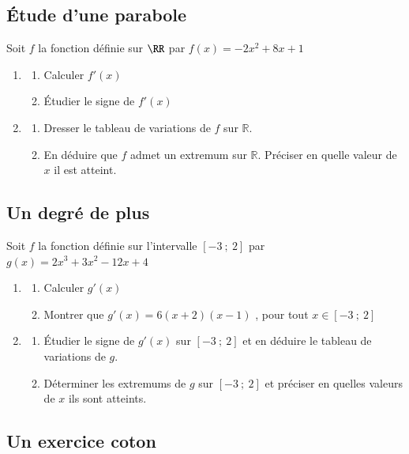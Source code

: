 \documentclass[oneside,12pt]{article}          %
\begin{document}
\subsection{Étude d'une parabole}
Soit $f$ la fonction définie sur $\RR$ par $f(x)=-2x^2+8x+1$
\begin{enumerate}[itemsep = 0pt]
    \item 
    \begin{enumerate}
        \item Calculer $f'(x)$
        \item Étudier le signe de $f'(x)$
    \end{enumerate}
    \item 
    \begin{enumerate}
        \item Dresser le tableau de variations de $f$ sur $\mathbb{R}$.
        \item En déduire que $f$ admet un extremum sur $\mathbb{R}$.
        Préciser en quelle valeur de $x$ il est atteint.
    \end{enumerate}
\end{enumerate}



\subsection{Un degré de plus}
Soit $f$ la fonction définie sur l'intervalle $[-3 ~;~ 2]$ par $g(x)=2x^3+3x^2-12x+4$
\begin{enumerate}[itemsep = 0pt]
    \item
    \begin{enumerate}
        \item Calculer $g'(x)$
        \item Montrer que $g'(x)=6(x+2)(x-1)$ , \quad pour tout $x\in[-3 ~;~ 2]$ 
    \end{enumerate}
    \item
    \begin{enumerate}
        \item Étudier le signe de $g'(x)$ sur $[-3 ~;~ 2]$ et en déduire le tableau de variations de $g$.
        \item Déterminer les extremums de $g$ sur $[-3 ~;~ 2]$ et préciser en quelles valeurs de $x$ ils sont atteints.
    \end{enumerate}
\end{enumerate}



\subsection{Un exercice coton}
\end{document}
